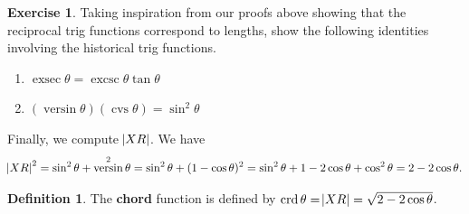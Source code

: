 \documentclass[a4paper,leqno]{article}
\numberwithin{equation}{section}
\theoremstyle{definition}
\newtheorem{defn}[equation]{Definition}
\newtheorem{exercise}[equation]{Exercise}
\theoremstyle{remark}
\newcommand{\df}[1]{\textbf{#1}}
\DeclareMathOperator{\versin}{versin}
\DeclareMathOperator{\cvs}{cvs}
\DeclareMathOperator{\exsec}{exsec}
\DeclareMathOperator{\excsc}{excsc}
\DeclareMathOperator{\crd}{crd}
\begin{document}
\begin{exercise}
  Taking inspiration from our proofs above showing that the reciprocal trig functions correspond
  to lengths, show the following identities involving the historical trig functions.
  \begin{enumerate}
    \item $ \exsec \theta = \excsc \theta \tan \theta $
    \item $ (\versin \theta)(\cvs \theta) = \sin^2 \theta $
  \end{enumerate}
\end{exercise}

Finally, we compute $ \abs{XR} $. We have
\begin{displaymath}
  \abs{XR}^2 = \sin^2 \theta + \versin^2 \theta = \sin^2 \theta + (1 - \cos \theta)^2 = \sin^2 \theta + 1 - 2\cos \theta + \cos^2 \theta = 2 - 2\cos \theta.
\end{displaymath}

\begin{defn}\label{defn:chord}
  The \df{chord} function is defined by $ \crd \theta = \abs{XR} = \sqrt{2 - 2\cos \theta} $.
\end{defn}
\end{document}
